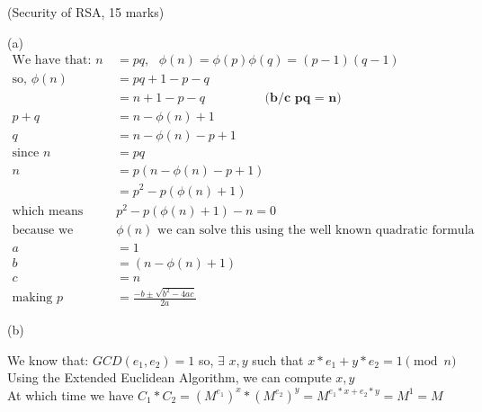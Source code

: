 \documentclass{assignment}
\begin{document}
\begin{flushleft}
\begin{problemlist}
\pbitem (Security of RSA, 15 marks)
\item[(a)] \hspace{1cm}\\
\begin{align*}
\text{We have that: } n &= pq,\text{ } \phi(n) = \phi(p)\phi(q) = (p-1)(q-1)\\
\text{so, }\phi(n) &= pq + 1 - p - q\\
&= n + 1 - p - q \hspace{2cm} \textbf{(b/c pq = n)}\\
p + q &= n - \phi(n) + 1\\
q &=n - \phi(n) - p + 1\\
\text{since } n &= pq\\
n &= p(n - \phi(n) - p + 1)\\
&= p^2 - p(\phi(n) + 1)\\
\text{which means }& p^2 - p(\phi(n) + 1) -n = 0\\
\text{because we know n and }&\phi(n)\text{ we can solve this using the well known quadratic formula where,}\\
a &= 1\\
b &= (n - \phi(n) + 1)\\
c &= n\\
\text{making } p &= \frac{-b\pm \sqrt{b^2-4ac}}{2a}
\end{align*}
\item[(b)]\hspace{1cm}\\
\begin{doublespace}
We know that: $GCD(e_1,e_2) = 1$ so, $\exists$ $x,y$ such that $ x*e_1 + y*e_2 = 1 \pmod{n}$\\
Using the Extended Euclidean Algorithm, we can compute $x,y$\\
At which time we have $C_{1} * C_{2} = (M^{e_1})^{x} * (M^{e_2})^{y} = M^{e_1*x + e_2*y} = M^{1} = M$\\


\end{doublespace}
\end{problemlist}
\end{flushleft}
\end{document}

